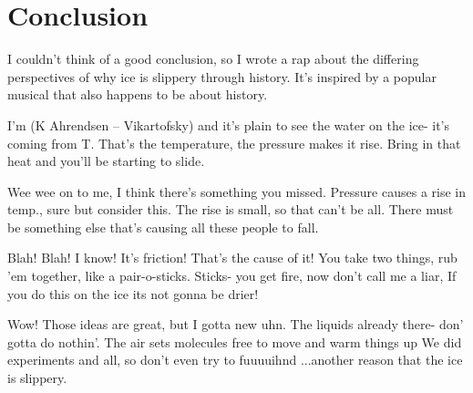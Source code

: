 \documentclass[12pt]{article}
\begin{document}
\section{Conclusion}
I couldn't think of a good conclusion, so I wrote a rap
about the differing perspectives of why ice is slippery 
through history. It's inspired by a popular musical that
also happens to be about history.

I'm (K Ahrendsen -- Vikartofsky) and it's plain to see 
the water on the ice- it's coming from T.
That's the temperature, the pressure makes it rise. 
Bring in that heat and you'll be starting to slide. 

Wee wee on to me, I think there's something you missed.
Pressure causes a rise in temp., sure but consider this.
The rise is small, so that can't be all. 
There must be something else that's causing all these people to fall. 

Blah! Blah! I know! It's friction! That's the cause of it!
You take two things, rub 'em together, like a pair-o-sticks.
Sticks- you get fire, now don't call me a liar,
If you do this on the ice its not gonna be drier!

Wow! Those ideas are great, but I gotta new uhn.
The liquids already there- don' gotta do nothin'.
The air sets molecules free to move and warm things up
We did experiments and all, so don't even try to fuuuuihnd
...another reason that the ice is slippery.
\end{document}
